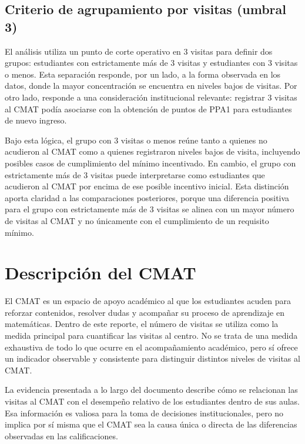 \documentclass[10pt,letterpaper]{article} %
\numberwithin{figure}{subsection}
\let\oldsection\section
\renewcommand{\section}{\clearpage\oldsection}
\begin{document}
\subsection{Criterio de agrupamiento por visitas (umbral 3)}
El análisis utiliza un punto de corte operativo en 3 visitas para definir dos grupos: estudiantes con estrictamente más de 3 visitas y estudiantes con 3 visitas o menos. Esta separación responde, por un lado, a la forma observada en los datos, donde la mayor concentración se encuentra en niveles bajos de visitas. Por otro lado, responde a una consideración institucional relevante: registrar 3 visitas al CMAT podía asociarse con la obtención de puntos de PPA1 para estudiantes de nuevo ingreso.

Bajo esta lógica, el grupo con 3 visitas o menos reúne tanto a quienes no acudieron al CMAT como a quienes registraron niveles bajos de visita, incluyendo posibles casos de cumplimiento del mínimo incentivado. En cambio, el grupo con estrictamente más de 3 visitas puede interpretarse como estudiantes que acudieron al CMAT por encima de ese posible incentivo inicial. Esta distinción aporta claridad a las comparaciones posteriores, porque una diferencia positiva para el grupo con estrictamente más de 3 visitas se alinea con un mayor número de visitas al CMAT y no únicamente con el cumplimiento de un requisito mínimo.


\FloatBarrier
\section{Descripción del CMAT}
El CMAT es un espacio de apoyo académico al que los estudiantes acuden para reforzar contenidos, resolver dudas y acompañar su proceso de aprendizaje en matemáticas. Dentro de este reporte, el número de visitas se utiliza como la medida principal para cuantificar las visitas al centro. No se trata de una medida exhaustiva de todo lo que ocurre en el acompañamiento académico, pero sí ofrece un indicador observable y consistente para distinguir distintos niveles de visitas al CMAT.

La evidencia presentada a lo largo del documento describe cómo se relacionan las visitas al CMAT con el desempeño relativo de los estudiantes dentro de sus aulas. Esa información es valiosa para la toma de decisiones institucionales, pero no implica por sí misma que el CMAT sea la causa única o directa de las diferencias observadas en las calificaciones.
\end{document}
